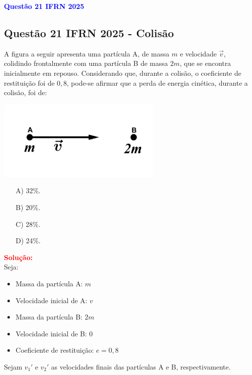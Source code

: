 \documentclass[a4paper,12pt]{article}
\begin{document}
\begin{flushleft}
\textbf{\textcolor{blue}{\Large Quest\~ao 21 IFRN 2025}}\\
\noindent
\subsection{Quest\~ao 21 IFRN 2025 - Colisão}
A figura a seguir apresenta uma partícula A, de massa $m$ e velocidade $\vec{v}$, 
colidindo frontalmente com uma partícula B de massa $2m$, que se encontra 
inicialmente em repouso. Considerando que, durante a colisão, o coeficiente de 
restituição foi de $0{,}8$, pode-se afirmar que a perda de energia cinética, durante a 
colisão, foi de:

\begin{center}
\includegraphics[width=0.6\textwidth]{figures/colisao.png}
\end{center}  

\begin{itemize}
\item[A)] 32\%.
\item[B)] 20\%.
\item[C)] 28\%.
\item[D)] 24\%.
\end{itemize}

\vspace{0.5cm}

\textcolor{red}{\textbf{Solução:}}\\

Seja:
\begin{itemize}
  \item Massa da partícula A: $m$
  \item Velocidade inicial de A: $v$
  \item Massa da partícula B: $2m$
  \item Velocidade inicial de B: $0$
  \item Coeficiente de restituição: $e = 0{,}8$
\end{itemize}

Sejam $v_1'$ e $v_2'$ as velocidades finais das partículas A e B, respectivamente.


\end{flushleft}
\end{document}
